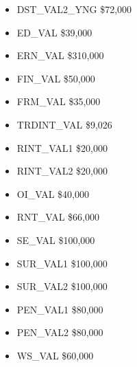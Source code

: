 \documentclass{article}
\begin{document}
\begin{itemize}
\begin{itemize}
	\item DST\_VAL2\_YNG \$72,000
	\item ED\_VAL \$39,000 
	\item ERN\_VAL \$310,000 
	\item FIN\_VAL \$50,000 
	\item FRM\_VAL \$35,000 
	\item TRDINT\_VAL \$9,026
	\item RINT\_VAL1 \$20,000
	\item RINT\_VAL2 \$20,000
	\item OI\_VAL \$40,000 
	\item RNT\_VAL \$66,000 
	\item SE\_VAL \$100,000
	\item SUR\_VAL1 \$100,000
	\item SUR\_VAL2 \$100,000
	\item PEN\_VAL1 \$80,000
	\item PEN\_VAL2 \$80,000
	\item WS\_VAL \$60,000	
	\end{itemize}
\end{itemize}
\end{document}
